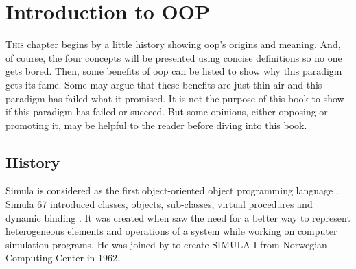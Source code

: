 \documentclass[12pt]{book}
\begin{document}
\fi

\chapter{Introduction to OOP}

\begin{introduction} %
	\lettrine{T}{his} chapter begins by a little history showing \ac{oop}'s origins and meaning.
	And, of course, the four concepts will be presented using concise definitions so no one gets bored.
	Then, some benefits of \ac{oop} can be listed to show why this paradigm gets its fame.
	Some may argue that these benefits are just thin air and this paradigm has failed what it promised.  
	It is not the purpose of this book to show if this paradigm has failed or succeed. 
	But some opinions, either opposing or promoting it, may be helpful to the reader before diving into this book.
\end{introduction}

\section{History}

Simula is considered as the first object-oriented object programming language \citep{2004-huang}.
Simula 67 introduced classes, objects, sub-classes, virtual procedures and dynamic binding \citep{2013-black}.
It was created when  saw the need for a better way to represent heterogeneous elements and operations of a system while working on computer simulation programs.
He was joined by  to create SIMULA I from Norwegian Computing Center in 1962.
\end{document}
